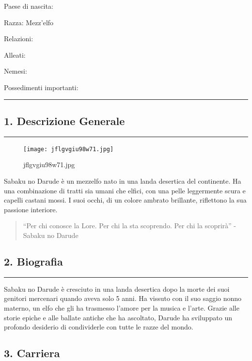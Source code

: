 Paese di nascita:

Razza: Mezz'elfo

Relazioni:

Alleati:

Nemesi:

Possedimenti importanti:

\begin{center}\rule{0.5\linewidth}{0.5pt}\end{center}

\subsection{1. Descrizione Generale}\label{descrizione-generale}

\begin{center}\rule{0.5\linewidth}{0.5pt}\end{center}

\begin{figure}
\centering
\texttt{[image: jflgvgiu98w71.jpg]}
\caption{jflgvgiu98w71.jpg}
\end{figure}

Sabaku no Darude è un mezzelfo nato in una landa desertica del
continente. Ha una combinazione di tratti sia umani che elfici, con una
pelle leggermente scura e capelli castani mossi. I suoi occhi, di un
colore ambrato brillante, riflettono la sua passione interiore.

\begin{quote}
``Per chi conosce la Lore. Per chi la sta scoprendo. Per chi la
scoprirà'' - Sabaku no Darude
\end{quote}

\subsection{2. Biografia}\label{biografia}

\begin{center}\rule{0.5\linewidth}{0.5pt}\end{center}

Sabaku no Darude è cresciuto in una landa desertica dopo la morte dei
suoi genitori mercenari quando aveva solo 5 anni. Ha vissuto con il suo
saggio nonno materno, un elfo che gli ha trasmesso l'amore per la musica
e l'arte. Grazie alle storie epiche e alle ballate antiche che ha
ascoltato, Darude ha sviluppato un profondo desiderio di condividerle
con tutte le razze del mondo.

\subsection{3. Carriera}\label{carriera}

